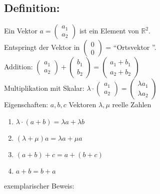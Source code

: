 %
%
%
\subsection{Definition:}
Ein Vektor $a= \begin{pmatrix} a_{1}\\  a_{2} \end{pmatrix}$ ist ein Element von $\mathbb{R}^{2}$.\\
Entspringt der Vektor in $\begin{pmatrix} 0 \\ 0 \end{pmatrix}$ = "`Ortsvektor "'.\\
%
%
%
%
Addition: $\begin{pmatrix}a_{1} \\ a_{2} \end{pmatrix} + \begin{pmatrix} b_{1} \\ b_{2} \end{pmatrix} = \begin{pmatrix} a_{1}+b_{1} \\ a_{2}+b_{2} \end{pmatrix} $\\
Multiplikation mit Skalar: $\lambda \cdot \begin{pmatrix} a_{1} \\ a_{2} \end{pmatrix} = \begin{pmatrix} \lambda a_{1} \\ \lambda a_{2} \end{pmatrix}$\\
Eigenschaften: $a,b,c$ Vektoren $\lambda, \mu $ reelle Zahlen
\begin{enumerate}
\item $\lambda \cdot (a+b) = \lambda a + \lambda b$
\item $(\lambda + \mu) a = \lambda a + \mu a$
\item $(a+b)+c=a+(b+c)$
\item $a+b = b+a$
\end{enumerate}
exemplarischer Beweis:\\
